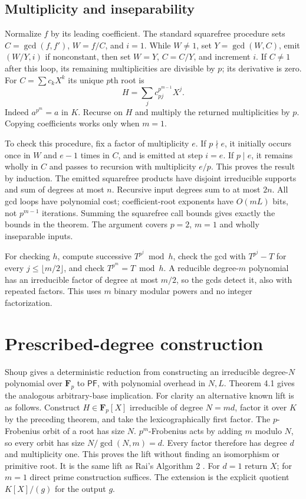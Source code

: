 \documentclass[11pt]{article}
\newcommand{\Fp}{\mathbf F_p}
\newcommand{\PF}{\mathsf{PF}}
\begin{document}
\subsection{Multiplicity and inseparability}
Normalize $f$ by its leading coefficient. The standard squarefree procedure
sets $C=\gcd(f,f')$, $W=f/C$, and $i=1$. While $W\ne1$, set
$Y=\gcd(W,C)$, emit $(W/Y,i)$ if nonconstant, then set
$W=Y$, $C=C/Y$, and increment $i$. If $C\ne1$ after this loop, its
remaining multiplicities are divisible by $p$; its derivative is zero.
For $C=\sum c_k X^k$ its unique $p$th root is
\[
 H=\sum_j c_{pj}^{p^{m-1}}X^j.
\]
Indeed $a^{p^m}=a$ in $K$. Recurse on $H$ and multiply the returned
multiplicities by $p$. Copying coefficients works only when $m=1$.

To check this procedure, fix a factor of multiplicity $e$. If $p\nmid e$,
it initially occurs once in $W$ and $e-1$ times in $C$, and is emitted
at step $i=e$. If $p\mid e$, it remains wholly in $C$ and passes to
recursion with multiplicity $e/p$. This proves the result by induction.
The emitted squarefree products have disjoint irreducible supports and
sum of degrees at most $n$. Recursive input degrees sum to at most $2n$.
All gcd loops have polynomial cost; coefficient-root exponents have
$O(mL)$ bits, not $p^{m-1}$ iterations. Summing the squarefree call bounds
gives exactly the bounds in the theorem. The argument covers $p=2$, $m=1$
and wholly inseparable inputs.

For checking $h$, compute successive $T^{p^j}\bmod h$, check the gcd with
$T^{p^j}-T$ for every $j\le\lfloor m/2\rfloor$, and check
$T^{p^m}=T\bmod h$. A reducible degree-$m$ polynomial has an irreducible
factor of degree at most $m/2$, so the gcds detect it, also with repeated
factors. This uses $m$ binary modular powers and no integer factorization.

\section{Prescribed-degree construction}
Shoup \cite[Theorem 3.1]{Shoup90} gives a deterministic reduction from
constructing an irreducible degree-$N$ polynomial over $\Fp$ to $\PF$,
with polynomial overhead in $N,L$. Theorem 4.1 gives the analogous
arbitrary-base implication. For clarity an alternative known lift is as follows.
Construct $H\in\Fp[X]$ irreducible of degree $N=md$, factor it over $K$
by the preceding theorem, and take the lexicographically first factor.
The $p$-Frobenius orbit of a root has size $N$. $p^m$-Frobenius acts
by adding $m$ modulo $N$, so every orbit has size
$N/\gcd(N,m)=d$. Every factor therefore has degree $d$ and multiplicity
one. This proves the lift without finding an isomorphism or primitive
root. It is the same lift as Rai's Algorithm 2 \cite{Rai24}.
For $d=1$ return $X$; for $m=1$ direct prime construction suffices.
The extension is the explicit quotient $K[X]/(g)$ for the output $g$.
\end{document}
